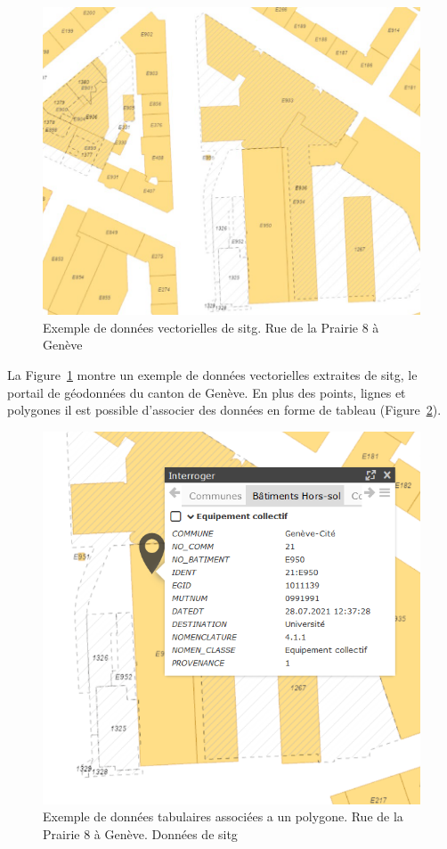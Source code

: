 \begin{figure}[H]
    \centering
    \includegraphics[width=1\linewidth]{03-tail//A1_fondamentaux_ML//A1_figures/A1_20_donnees_vectorielles_exemple.png}
    \caption{Exemple de données vectorielles de \acrshort{sitg}. Rue de la Prairie 8 à Genève}
    \label{fig:A1_20_donnees_vectorielles_exemple}
\end{figure}

La Figure~\ref{fig:A1_20_donnees_vectorielles_exemple} montre un exemple de données vectorielles extraites de \acrshort{sitg}, le portail de géodonnées du canton de Genève. En plus des points, lignes et polygones il est possible d'associer des données en forme de tableau (Figure~\ref{fig:A1_21_donnees_vectorielles_tableau}).

\begin{figure}[H]
    \centering
    \includegraphics[width=0.75\linewidth]{03-tail//A1_fondamentaux_ML//A1_figures/A1_21_donnees_vectorielles_tableau.png}
    \caption{Exemple de données tabulaires associées a un polygone. Rue de la Prairie 8 à Genève. Données de \acrshort{sitg}}
    \label{fig:A1_21_donnees_vectorielles_tableau}
\end{figure}

